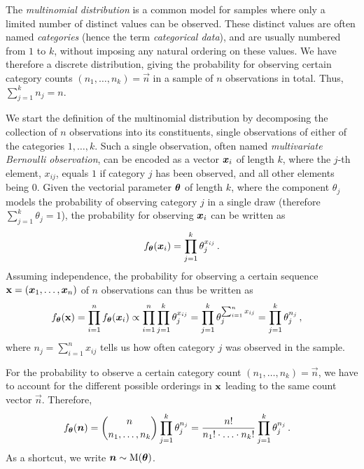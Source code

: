 The \emph{multinomial distribution} is a common model for samples where only a limited number of distinct values can be observed.
These distinct values are often named \emph{categories} (hence the term \emph{categorical data}),
and are usually numbered from $1$ to $k$, without imposing any natural ordering on these values.
We have therefore a discrete distribution,
giving the probability for observing certain category counts $(n_1, \ldots, n_k) = \vec{n}$ in a sample of $n$ observations in total.
Thus, $\sum_{j=1}^k n_j = n$.

We start the definition of the multinomial distribution by decomposing the collection of $n$ observations into its constituents,
single observations of either of the categories $1,\ldots,k$.
Such a single observation, often named \emph{multivariate Bernoulli observation}, can be encoded as a vector ${\bm x}_i$ of length $k$,
where the $j$-th element, $x_{ij}$, equals $1$ if category $j$ has been observed, and all other elements being $0$.
Given the vectorial parameter $\boldsymbol{\theta}$ of length $k$,
where the component $\theta_j$ models the probability of observing category $j$ in a single draw
(therefore $\sum_{j=1}^k \theta_j = 1$),
the probability for observing ${\bm x}_i$ can be written as
\begin{align*}
f_{\boldsymbol{\theta}}({\bm x}_i) = \prod_{j=1}^k \theta_j^{x_{ij}}\,.
\end{align*}
Assuming independence, the probability for observing a certain sequence
$\mathbf{x} = ({\bm x}_1, \ldots, {\bm x}_n)$ of $n$ observations can thus be written as
\begin{align*}
f_{\boldsymbol{\theta}}(\mathbf{x}) &= \prod_{i=1}^n f_{\boldsymbol{\theta}}({\bm x}_i)
                \propto \prod_{i=1}^n \prod_{j=1}^k \theta_j^{x_{ij}}
                      = \prod_{j=1}^k \theta_j^{\sum_{i=1}^n x_{ij}}
                      = \prod_{j=1}^k \theta_j^{n_j}\,,
\end{align*}
where $n_j = \sum_{i=1}^n x_{ij}$ tells us how often category $j$ was observed in the sample.

For the probability to observe a certain category count $(n_1, \ldots, n_k) = \vec{n}$,
we have to account for the different possible orderings in $\mathbf{x}$ leading to the same count vector $\vec{n}$.
Therefore,
\begin{align}\label{eq:multinomdens}
f_{\boldsymbol{\theta}}({\bm n}) &= \binom{n}{n_1,\ldots,n_k} \prod_{j=1}^k \theta_j^{n_j}
                      = \frac{n!}{n_1!\cdot \ldots \cdot n_k!} \prod_{j=1}^k \theta_j^{n_j}\,.
\end{align}
As a shortcut, we write ${\bm n} \sim \operatorname{M}(\boldsymbol{\theta})$.


